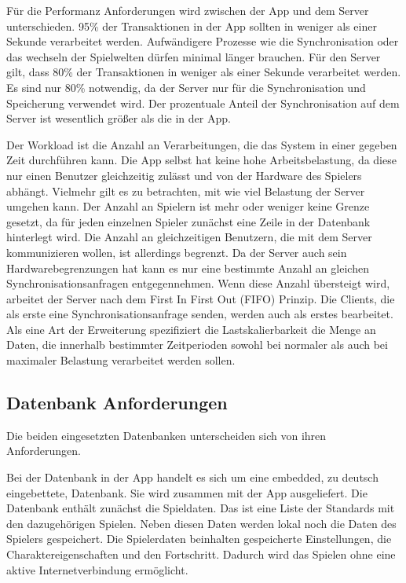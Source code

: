 		Für die Performanz Anforderungen wird zwischen der App und dem Server unterschieden. 95\% der Transaktionen in der App sollten in weniger als einer Sekunde verarbeitet werden. Aufwändigere Prozesse wie die Synchronisation oder das wechseln der Spielwelten dürfen minimal länger brauchen. Für den Server gilt, dass 80\% der Transaktionen in weniger als einer Sekunde verarbeitet werden. Es sind nur 80\% notwendig, da der Server nur für die Synchronisation und Speicherung verwendet wird. Der prozentuale Anteil der Synchronisation auf dem Server ist wesentlich größer als die in der App. 
		
		Der Workload ist die Anzahl an Verarbeitungen, die das System in einer gegeben Zeit durchführen kann. Die App selbst hat keine hohe Arbeitsbelastung, da diese nur einen Benutzer gleichzeitig zulässt und von der Hardware des Spielers abhängt. Vielmehr gilt es zu betrachten, mit wie viel Belastung der Server umgehen kann. Der Anzahl an Spielern ist mehr oder weniger keine Grenze gesetzt, da für jeden einzelnen Spieler zunächst eine Zeile in der Datenbank hinterlegt wird. Die Anzahl an gleichzeitigen Benutzern, die mit dem Server kommunizieren wollen, ist allerdings begrenzt. Da der Server auch sein Hardwarebegrenzungen hat kann es nur eine bestimmte Anzahl an gleichen Synchronisationsanfragen entgegennehmen. Wenn diese Anzahl übersteigt wird, arbeitet der Server nach dem First In First Out (FIFO) Prinzip. Die Clients, die als erste eine Synchronisationsanfrage senden, werden auch als erstes bearbeitet. Als eine Art der Erweiterung spezifiziert die Lastskalierbarkeit die Menge an Daten, die innerhalb bestimmter Zeitperioden sowohl bei normaler als auch bei maximaler Belastung verarbeitet werden sollen.

	\subsection{Datenbank Anforderungen}
		Die beiden eingesetzten Datenbanken unterscheiden sich von ihren Anforderungen.
		
		Bei der Datenbank in der App handelt es sich um eine embedded, zu deutsch eingebettete, Datenbank. Sie wird zusammen mit der App ausgeliefert. Die Datenbank enthält zunächst die Spieldaten. Das ist eine Liste der Standards mit den dazugehörigen Spielen. Neben diesen Daten werden lokal noch die Daten des Spielers gespeichert. Die Spielerdaten beinhalten gespeicherte Einstellungen, die Charaktereigenschaften und den Fortschritt. Dadurch wird das Spielen ohne eine aktive Internetverbindung ermöglicht.
		
